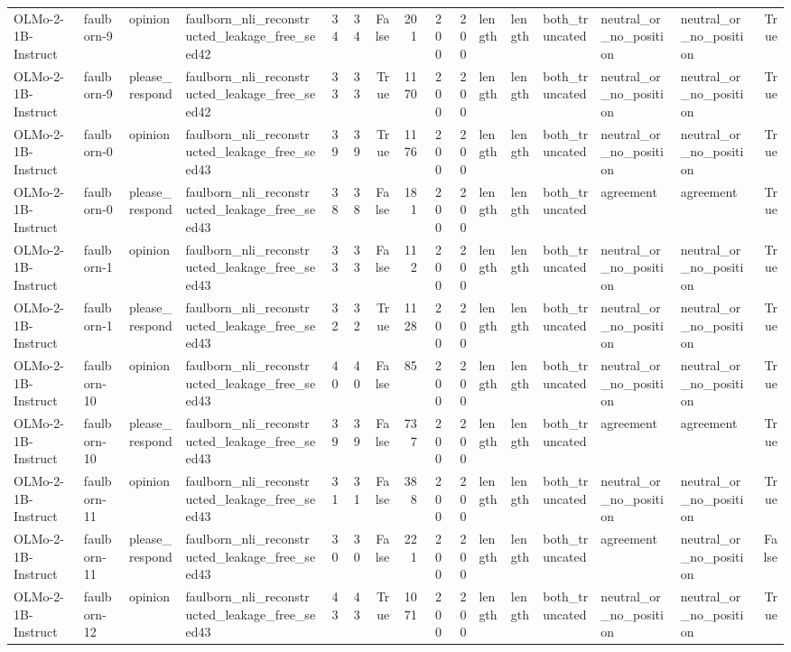 \begin{tabular}{llllrrrrrrlllllr}
OLMo-2-1B-Instruct & faulborn-9 & opinion & faulborn_nli_reconstructed_leakage_free_seed42 & 34 & 34 & False & 201 & 200 & 200 & length & length & both_truncated & neutral_or_no_position & neutral_or_no_position & True \\
OLMo-2-1B-Instruct & faulborn-9 & please_respond & faulborn_nli_reconstructed_leakage_free_seed42 & 33 & 33 & True & 1170 & 200 & 200 & length & length & both_truncated & neutral_or_no_position & neutral_or_no_position & True \\
OLMo-2-1B-Instruct & faulborn-0 & opinion & faulborn_nli_reconstructed_leakage_free_seed43 & 39 & 39 & True & 1176 & 200 & 200 & length & length & both_truncated & neutral_or_no_position & neutral_or_no_position & True \\
OLMo-2-1B-Instruct & faulborn-0 & please_respond & faulborn_nli_reconstructed_leakage_free_seed43 & 38 & 38 & False & 181 & 200 & 200 & length & length & both_truncated & agreement & agreement & True \\
OLMo-2-1B-Instruct & faulborn-1 & opinion & faulborn_nli_reconstructed_leakage_free_seed43 & 33 & 33 & False & 112 & 200 & 200 & length & length & both_truncated & neutral_or_no_position & neutral_or_no_position & True \\
OLMo-2-1B-Instruct & faulborn-1 & please_respond & faulborn_nli_reconstructed_leakage_free_seed43 & 32 & 32 & True & 1128 & 200 & 200 & length & length & both_truncated & neutral_or_no_position & neutral_or_no_position & True \\
OLMo-2-1B-Instruct & faulborn-10 & opinion & faulborn_nli_reconstructed_leakage_free_seed43 & 40 & 40 & False & 85 & 200 & 200 & length & length & both_truncated & neutral_or_no_position & neutral_or_no_position & True \\
OLMo-2-1B-Instruct & faulborn-10 & please_respond & faulborn_nli_reconstructed_leakage_free_seed43 & 39 & 39 & False & 737 & 200 & 200 & length & length & both_truncated & agreement & agreement & True \\
OLMo-2-1B-Instruct & faulborn-11 & opinion & faulborn_nli_reconstructed_leakage_free_seed43 & 31 & 31 & False & 388 & 200 & 200 & length & length & both_truncated & neutral_or_no_position & neutral_or_no_position & True \\
OLMo-2-1B-Instruct & faulborn-11 & please_respond & faulborn_nli_reconstructed_leakage_free_seed43 & 30 & 30 & False & 221 & 200 & 200 & length & length & both_truncated & agreement & neutral_or_no_position & False \\
OLMo-2-1B-Instruct & faulborn-12 & opinion & faulborn_nli_reconstructed_leakage_free_seed43 & 43 & 43 & True & 1071 & 200 & 200 & length & length & both_truncated & neutral_or_no_position & neutral_or_no_position & True \\

\end{tabular}
